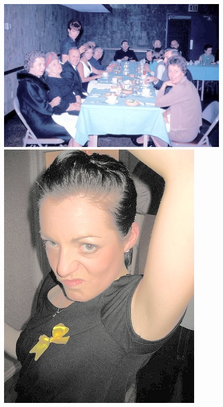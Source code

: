 \begin{appendices}
\begin{figure}[htb]
\center
\begin{minipage}{0.19\textwidth}
\includegraphics[width=\textwidth]{images/anomalien/HA/000613.jpg}
\end{minipage}
\begin{minipage}{0.19\textwidth}
\includegraphics[width=\textwidth]{images/anomalien/HA/000750.jpg}

\end{minipage}
\end{figure}
\end{appendices}
